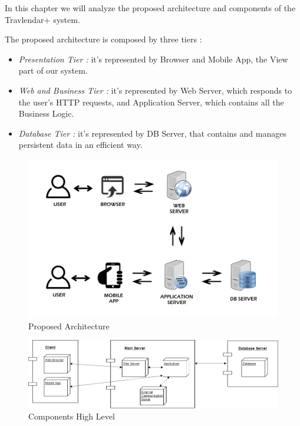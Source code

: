 \vspace*{-5mm}

In this chapter we will analyze the proposed architecture and components of the Travlendar+ system.\par
The proposed architecture is composed by three tiers :
\begin{itemize}
	\setlength{\leftskip}{0.5cm}
	\item \emph{Presentation Tier : }it's represented by Browser and Mobile App, the View part of our system.
	\item \emph{Web and Business Tier : }it's represented by Web Server, which responds to the user's HTTP requests, and Application Server, which contains all the Business Logic.
	\item \emph{Database Tier : }it's represented by DB Server, that contains and manages persistent data in an efficient way.
\end{itemize}
\begin{figure}[H]
	\centering
	\includegraphics[scale=0.4]{Images/Architecture/Proposed_Architecture}
	\caption{Proposed Architecture}
\end{figure}

\begin{figure}[H]
	\centering
	\includegraphics[scale=0.4]{Images/Architecture/Components_High_Level}
	\caption{Components High Level}
\end{figure}

